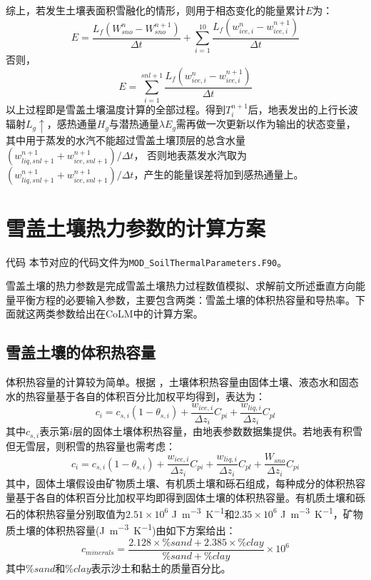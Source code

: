 综上，若发生土壤表面积雪融化的情形，则用于相态变化的能量累计$E$为：
\begin{equation}
E=\frac{L_{f}\left(W_{sno}^{n}-W_{sno}^{n+1}\right)}{\Delta t}+\sum_{i=1}^{10} \frac{L_{f}\left(w_{ice, i}^{n}-w_{ice, i}^{n+1}\right)}{\Delta t}
\end{equation}
否则，
\begin{equation}
E=\sum_{i=1}^{s n l+1} \frac{L_{f}\left(w_{ice, i}^{n}-w_{ice, i}^{n+1}\right)}{\Delta t}
\end{equation}
以上过程即是雪盖土壤温度计算的全部过程。得到$T_i^{n+1}$后，地表发出的上行长波辐射$L_g\uparrow$，感热通量$H_g$与潜热通量$\lambda E_g$需再做一次更新以作为输出的状态变量，
其中用于蒸发的水汽不能超过雪盖土壤顶层的总含水量$\left(w_{liq,snl+1}^{n+1}+w_{ice,snl+1}^{n+1}\right)/\Delta t$，
否则地表蒸发水汽取为$\left(w_{liq,snl+1}^{n+1}+w_{ice,snl+1}^{n+1}\right)/\Delta t$，产生的能量误差将加到感热通量上。

\section{雪盖土壤热力参数的计算方案}\label{sec_thermalpar}
\begin{mymdframed}{代码}
本节对应的代码文件为\texttt{MOD\_SoilThermalParameters.F90}。
\end{mymdframed}

雪盖土壤的热力参数是完成雪盖土壤热力过程数值模拟、求解前文所述垂直方向能量平衡方程的必要输入参数，主要包含两类：雪盖土壤的体积热容量和导热率。下面就这两类参数给出在CoLM中的计算方案。

\subsection{雪盖土壤的体积热容量}

体积热容量的计算较为简单。根据 \citet{de1963thermal}，土壤体积热容量由固体土壤、液态水和固态水的热容量基于各自的体积百分比加权平均得到，表达为：
\begin{equation}
c_{i}=c_{s, i}\left(1-\theta_{s, i}\right)+\frac{w_{ice, i}}{\Delta z_{i}} C_{pi}+\frac{w_{liq, i}}{\Delta z_{i}} C_{p l}
\end{equation}
其中$c_{s,i}$表示第$i$层的固体土壤体积热容量，由地表参数数据集提供。若地表有积雪但无雪层，则积雪的热容量也需考虑：
\begin{equation}
c_{i}=c_{s,i}\left(1-\theta_{s, i}\right)+\frac{w_{ice, i}}{\Delta z_{i}} C_{pi}+\frac{w_{liq,i}}{\Delta z_{i}} C_{pl}+\frac{W_{sno}}{\Delta z_{i}} C_{pi}
\end{equation}
其中，固体土壤假设由矿物质土壤、有机质土壤和砾石组成，每种成分的体积热容量基于各自的体积百分比加权平均即得到固体土壤的体积热容量。有机质土壤和砾石的体积热容量分别取值为$2.51\times 10^6$ \unit{J.m^{-3}.K^{-1}}和$2.35\times 10^6$ \unit{J.m^{-3}.K^{-1}}，矿物质土壤的体积热容量(\unit{J.m^{-3}.K^{-1}})由如下方案给出：$$c_{minerals}=\frac{2.128\times\%sand+2.385\times\%clay}{\%sand+\%clay}\times10^6$$ 
其中$\%sand$和$\%clay$表示沙土和黏土的质量百分比。

